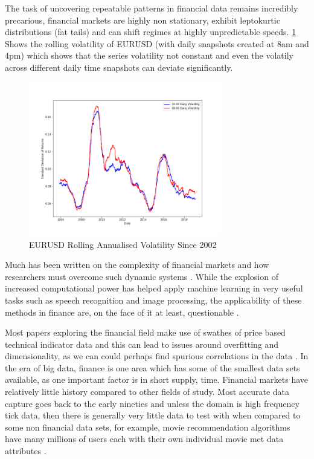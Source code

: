 \documentclass[12pt, a4paper]{article}
\begin{document}
The task of uncovering repeatable patterns in financial data remains incredibly precarious, financial markets are highly non stationary, exhibit leptokurtic distributions (fat tails) and can shift regimes at highly unpredictable speeds. \ref{fig:eurvol} Shows the rolling volatility of EURUSD (with daily snapshots created at 8am and 4pm) which shows that the series volatility not constant and even the volatily across different daily time snapshots can deviate significantly. \newline 
\begin{figure}[h]
    \centering
    \includegraphics[width=0.75\textwidth]{EURUSDRollingVol}
    \caption{EURUSD Rolling Annualised Volatility Since 2002}
    \label{fig:eurvol}
\end{figure}
Much has been written on the complexity of financial markets and how researchers must overcome such dynamic systems \cite{Lebaron1994}. \newline While the explosion of increased computational power has helped apply machine learning in very useful tasks such as speech recognition and image processing, the applicability of these methods in finance are, on the face of it at least, questionable \cite{Bailey2013}. 
\par
Most papers exploring the financial field make use of swathes of price based technical indicator data and this can lead to issues around overfitting and dimensionality, as we can could perhaps find spurious correlations in the data \cite{LopezdePrado2018}. In the era of big data, finance is one area which has some of the smallest data sets available, as one important factor is in short supply, time. Financial markets have relatively little history compared to other fields of study. Most accurate data capture goes back to the early nineties and unless the domain is high frequency tick data, then there is generally very little data to test with when compared to some non financial data sets, for example, movie recommendation algorithms have many millions of users each with their own individual movie met data attributes \cite{Portugal2018}. 
\end{document}

